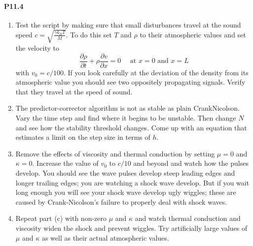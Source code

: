 \paragraph*{P11.4}
\begin{enumerate}[label=(\alph*)]
\item Test the script by making sure that small disturbances travel at the sound speed $c=\sqrt{\frac{\gamma k_{B} T}{M}}$. To do this set $T$ and $\rho$ to their atmospheric values and set the velocity to 
\begin{equation}\label{eq:1131}
\frac{\partial \rho}{\partial t}+\rho \frac{\partial v}{\partial x}=0 \quad \text { at } x=0 \text { and } x=L
\end{equation}
with $v_{0}=c / 100$. If you look carefully at the deviation of the density from its atmospheric value you should see two oppositely propagating signals. Verify that they travel at the speed of sound.

\item The predictor-corrector algorithm is not as stable as plain CrankNicolson. Vary the time step and find where it begins to be unstable. Then change $N$ and see how the stability threshold changes. Come up with an equation that estimates a limit on the step size in terms of $h$.

\item Remove the effects of viscosity and thermal conduction by setting $\mu=0$ and $\kappa=0$. Increase the value of $v_{0}$ to $c / 10$ and beyond and watch how the pulses develop. You should see the wave pulses develop steep leading edges and longer trailing edges; you are watching a shock wave develop. But if you wait long enough you will see your shock wave develop ugly wiggles; these are caused by Crank-Nicolson\rq s failure to properly deal with shock waves.

\item Repeat part (c) with non-zero $\mu$ and $\kappa$ and watch thermal conduction and viscosity widen the shock and prevent wiggles. Try artificially large values of $\mu$ and $\kappa$ as well as their actual atmospheric values.
\end{enumerate}
